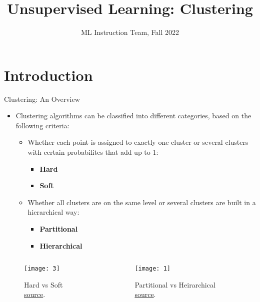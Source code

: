 \documentclass[compress,oilve]{beamer}
\title{Unsupervised Learning: Clustering}
\author{ML Instruction Team, Fall 2022}
\institute[]{CE Department \newline  Sharif University of Technology \newline \newline}
\date[\today]{}
\begin{document}
	
	\fontsize{9}{9}
\begin{frame}
	\titlepage
\end{frame}

\section{Introduction}

\begin{frame}{Clustering: An Overview}
\begin{itemize}
\item Clustering algorithms can be classified into different categories, based on the following criteria:
	\begin{itemize}
		\item Whether each point is assigned to exactly one cluster or several clusters with certain probabilites that add up to 1:
			\begin{itemize}
				\item \textbf{Hard}
				\item \textbf{Soft}
			\end{itemize}
		\item Whether all clusters are on the same level or several clusters are built in a hierarchical way:
			\begin{itemize}
				\item \textbf{Partitional}
				\item \textbf{Hierarchical}
			\end{itemize}
	\end{itemize}
\end{itemize}
\begin{columns}
	\begin{column}{0.5\textwidth}
		\begin{figure}
			 \centering
			 \texttt{[image: 3]} 
			 \caption{Hard vs Soft \href{https://www.researchgate.net/figure/Hard-vs-Soft-Clustering_fig1_341874469}{source}.}
		\end{figure}
	\end{column}
	\begin{column}{0.5\textwidth}
		\begin{figure}
			 \centering
			 \texttt{[image: 1]}  
 			 \caption{Partitional vs Heirarchical \href{https://quantdare.com/hierarchical-clustering/}{source}.}
		\end{figure}
	\end{column}
\end{columns}
\end{frame}
\end{document}

